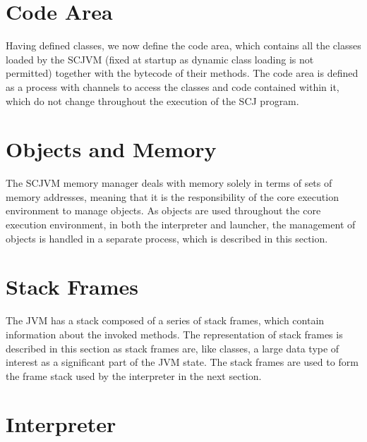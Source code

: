 

\section{Code Area}
\label{cee-code-area-section}

Having defined classes, we now define the code area, which contains
all the classes loaded by the SCJVM (fixed at startup as dynamic class
loading is not permitted) together with the bytecode of their methods.
The code area is defined as a \Circus{} process with channels to
access the classes and code contained within it, which do not change
throughout the execution of the SCJ program.



\section{Objects and Memory}
\label{cee-memory-section}

The SCJVM memory manager deals with memory solely in terms of sets of
memory addresses, meaning that it is the responsibility of the core
execution environment to manage objects.
As objects are used throughout the core execution environment, in both
the interpreter and launcher, the management of objects is handled in
a separate \Circus{} process, which is described in this section.



\section{Stack Frames}
\label{cee-stack-frames-section}

The JVM has a stack composed of a series of stack frames, which
contain information about the invoked methods.
The representation of stack frames is described in this section as
stack frames are, like classes, a large data type of interest as a
significant part of the JVM state.
The stack frames are used to form the frame stack used by the
interpreter in the next section.



\section{Interpreter}
\label{cee-interpreter-section}

